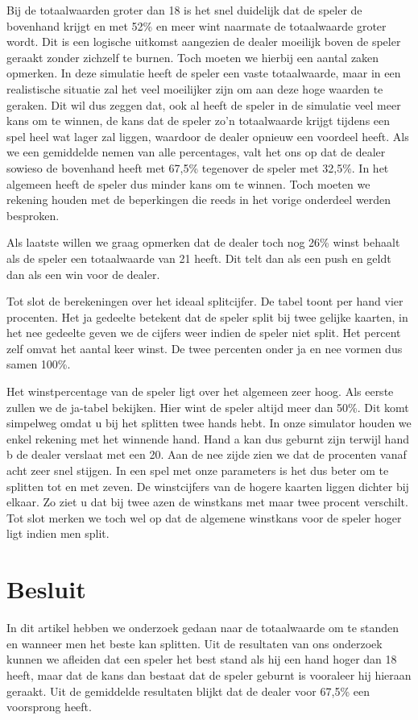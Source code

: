 \documentclass[11pt, final, journal, a4paper]{IEEEtran}
\begin{document}
Bij de totaalwaarden groter dan 18 is het snel duidelijk dat de speler de bovenhand krijgt en met 52\% en meer wint naarmate de totaalwaarde groter wordt. Dit is een logische uitkomst aangezien de dealer moeilijk boven de speler geraakt zonder zichzelf te burnen. Toch moeten we hierbij een aantal zaken opmerken. In deze simulatie heeft de speler een vaste totaalwaarde, maar in een realistische situatie zal het veel moeilijker zijn om aan deze hoge waarden te geraken. Dit wil dus zeggen dat, ook al heeft de speler in de simulatie veel meer kans om te winnen, de kans dat de speler zo’n totaalwaarde krijgt tijdens een spel heel wat lager zal liggen, waardoor de dealer opnieuw een voordeel heeft. Als we een gemiddelde nemen van alle percentages, valt het ons op dat de dealer sowieso de bovenhand heeft met 67,5\% tegenover de speler met 32,5\%. In het algemeen heeft de speler dus minder kans om te winnen. Toch moeten we rekening houden met de beperkingen die reeds in het vorige onderdeel werden besproken.

Als laatste willen we graag opmerken dat de dealer toch nog 26\% winst behaalt als de speler een totaalwaarde van 21 heeft. Dit telt dan als een push en geldt dan als een win voor de dealer.

Tot slot de berekeningen over het ideaal splitcijfer. De tabel toont per hand vier procenten. Het ja gedeelte betekent dat de speler split bij twee gelijke kaarten, in het nee gedeelte geven we de cijfers weer indien de speler niet split. Het percent zelf omvat het aantal keer winst. De twee percenten onder ja en nee vormen dus samen 100\%. 

Het winstpercentage van de speler ligt over het algemeen zeer hoog. Als eerste zullen we de ja-tabel bekijken. Hier wint de speler altijd meer dan 50\%. Dit komt simpelweg omdat u bij het splitten twee hands hebt. In onze simulator houden we enkel rekening met het winnende hand. Hand a kan dus geburnt zijn terwijl hand b de dealer verslaat met een 20. Aan de nee zijde zien we dat de procenten vanaf acht zeer snel stijgen. In een spel met onze parameters is het dus beter om te splitten tot en met zeven. De winstcijfers van de hogere kaarten liggen dichter bij elkaar. Zo ziet u dat bij twee azen de winstkans met maar twee procent verschilt. Tot slot merken we toch wel op dat de algemene winstkans voor de speler hoger ligt indien men split. 

\section{Besluit}
In dit artikel hebben we onderzoek gedaan naar de totaalwaarde om te standen en wanneer men het beste kan splitten. Uit de resultaten van ons onderzoek kunnen we afleiden dat een speler het best stand als hij een hand hoger dan 18 heeft, maar dat de kans dan bestaat dat de speler geburnt is vooraleer hij hieraan geraakt. Uit de gemiddelde resultaten blijkt dat de dealer voor 67,5\% een voorsprong heeft.
\end{document}
